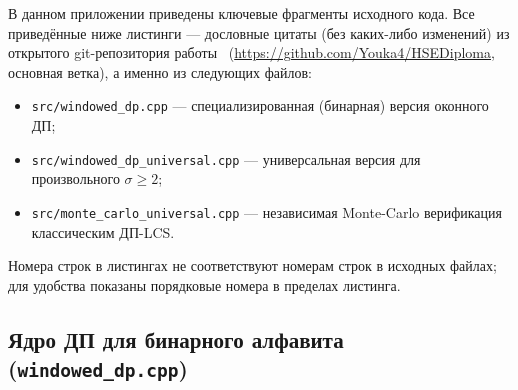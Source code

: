 В данном приложении приведены ключевые фрагменты исходного кода. Все приведённые ниже листинги --- дословные цитаты (без каких-либо изменений) из открытого git-репозитория работы~\cite{ourgithub} (\url{https://github.com/Youka4/HSEDiploma}, основная ветка), а именно из следующих файлов:
\begin{itemize}
    \item \texttt{src/windowed\_dp.cpp} --- специализированная (бинарная) версия оконного ДП;
    \item \texttt{src/windowed\_dp\_universal.cpp} --- универсальная версия для произвольного $\sigma \geq 2$;
    \item \texttt{src/monte\_carlo\_universal.cpp} --- независимая Monte-Carlo верификация классическим ДП-LCS.
\end{itemize}
Номера строк в листингах не соответствуют номерам строк в исходных файлах; для удобства показаны порядковые номера в пределах листинга.

\subsection*{Ядро ДП для бинарного алфавита (\texttt{windowed\_dp.cpp})}

